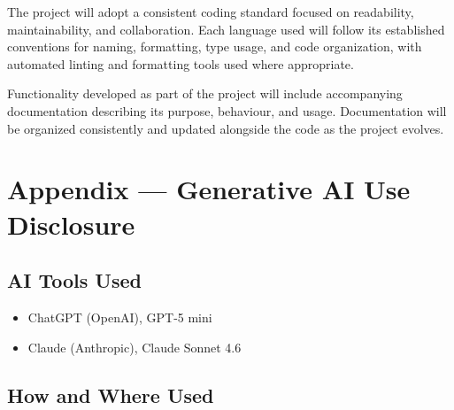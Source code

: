 \documentclass{article}
\begin{document}
The project will adopt a consistent coding standard focused on readability, maintainability, and collaboration. Each language used will follow its established conventions for naming, formatting, type usage, and code organization, with automated linting and formatting tools used where appropriate.

Functionality developed as part of the project will include accompanying documentation describing its purpose, behaviour, and usage. Documentation will be organized consistently and updated alongside the code as the project evolves.


\newpage{}

\section{Appendix --- Generative AI Use Disclosure}


\subsection{AI Tools Used}


\begin{itemize}
  \item ChatGPT (OpenAI), GPT-5 mini
  \item Claude (Anthropic), Claude Sonnet 4.6
\end{itemize}

\subsection{How and Where Used}



\end{document}
